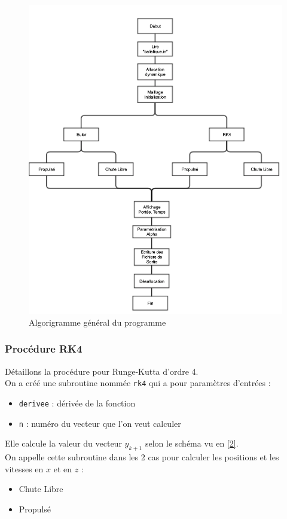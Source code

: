 \documentclass[a4paper,oneside]{article}
\makeatletter
\def\bigcenter{\trivlist \bigcentering\item\relax}
\def\bigcentering{\let\\\@centercr\rightskip\@bigflushglue%
\leftskip\@bigflushglue
\parindent\z@\parfillskip\z@skip}
\makeatother
\begin{document}
\begin{figure}[h!]
\bigcenter
\centering
\includegraphics[scale=0.7] {algorigramme}
\caption{Algorigramme général du programme}	
\end{figure}

\subsubsection{Procédure RK4}
Détaillons la procédure pour Runge-Kutta d'ordre 4.\\

On a créé une subroutine nommée \verb?rk4? qui a pour paramètres d'entrées : 
\begin{itemize}
	\item \verb?derivee? : dérivée de la fonction 
	\item \verb?n? : numéro du vecteur que l'on veut calculer
\end{itemize}
Elle calcule la valeur du vecteur $y_{k+1}$ selon le schéma vu en \ref{2}. 
\\

On appelle cette subroutine dans les 2 cas pour calculer les positions et les vitesses en $x$ et en $z$ : 
\begin{itemize}
\item Chute Libre
\item Propulsé	
\end{itemize}
\end{document}
